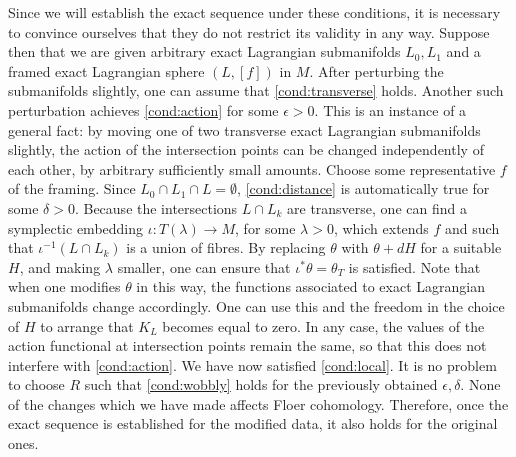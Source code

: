 \documentclass[10pt,letterpaper]{article}
\begin{document}
\begin{remark} \label{re:scope}
Since we will establish the exact sequence under these conditions, it is
necessary to convince ourselves that they do not restrict its validity in any
way. Suppose then that we are given arbitrary exact Lagrangian submanifolds
$L_0,L_1$ and a framed exact Lagrangian sphere $(L,[f])$ in $M$. After
perturbing the submanifolds slightly, one can assume that \ref{cond:transverse}
holds. Another such perturbation achieves \ref{cond:action} for some
$\epsilon>0$. This is an instance of a general fact: by moving one of two
transverse exact Lagrangian submanifolds slightly, the action of the
intersection points can be changed independently of each other, by arbitrary
sufficiently small amounts. Choose some representative $f$ of the framing.
Since $L_0 \cap L_1 \cap L = \emptyset$, \ref{cond:distance} is automatically
true for some $\delta>0$. Because the intersections $L \cap L_k$ are
transverse, one can find a symplectic embedding $\iota: T(\lambda) \rightarrow
M$, for some $\lambda>0$, which extends $f$ and such that $\iota^{-1}(L \cap
L_k)$ is a union of fibres. By replacing $\theta$ with $\theta + dH$ for a
suitable $H$, and making $\lambda$ smaller, one can ensure that $\iota^*\theta
= \theta_T$ is satisfied. Note that when one modifies $\theta$ in this way, the
functions associated to exact Lagrangian submanifolds change accordingly. One
can use this and the freedom in the choice of $H$ to arrange that $K_L$ becomes
equal to zero. In any case, the values of the action functional at intersection
points remain the same, so that this does not interfere with \ref{cond:action}.
We have now satisfied \ref{cond:local}. It is no problem to choose $R$ such
that \ref{cond:wobbly} holds for the previously obtained $\epsilon, \delta$.
None of the changes which we have made affects Floer cohomology. Therefore,
once the exact sequence is established for the modified data, it also holds for
the original ones.
\end{remark}
\end{document}
